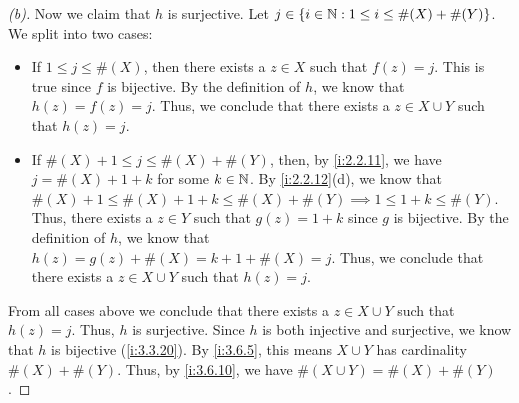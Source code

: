 \begin{proof}[(b)]
  Now we claim that \(h\) is surjective.
  Let \(j \in \left\lbrace i \in \mathbb{N} : 1 \leq i \leq \#(X) + \#(Y)\right\rbrace\).
  We split into two cases:
  \begin{itemize}
    \item If \(1 \leq j \leq \#(X)\), then there exists a \(z \in X\) such that \(f(z) = j\).
          This is true since \(f\) is bijective.
          By the definition of \(h\), we know that \(h(z) = f(z) = j\).
          Thus, we conclude that there exists a \(z \in X \cup Y\) such that \(h(z) = j\).
    \item If \(\#(X) + 1 \leq j \leq \#(X) + \#(Y)\), then, by \cref{i:2.2.11}, we have \(j = \#(X) + 1 + k\) for some \(k \in \mathbb{N}\).
          By \cref{i:2.2.12}(d), we know that \(\#(X) + 1 \leq \#(X) + 1 + k \leq \#(X) + \#(Y) \implies 1 \leq 1 + k \leq \#(Y)\).
          Thus, there exists a \(z \in Y\) such that \(g(z) = 1 + k\) since \(g\) is bijective.
          By the definition of \(h\), we know that \(h(z) = g(z) + \#(X) = k + 1 + \#(X) = j\).
          Thus, we conclude that there exists a \(z \in X \cup Y\) such that \(h(z) = j\).
  \end{itemize}
  From all cases above we conclude that there exists a \(z \in X \cup Y\) such that \(h(z) = j\).
  Thus, \(h\) is surjective.
  Since \(h\) is both injective and surjective, we know that \(h\) is bijective (\cref{i:3.3.20}).
  By \cref{i:3.6.5}, this means \(X \cup Y\) has cardinality \(\#(X) + \#(Y)\).
  Thus, by \cref{i:3.6.10}, we have \(\#(X \cup Y) = \#(X) + \#(Y)\).
\end{proof}

